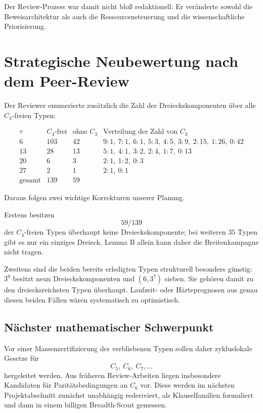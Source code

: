 \documentclass[11pt,a4paper]{article}
\begin{document}
Der Review-Prozess war damit nicht bloß redaktionell: Er veränderte sowohl die Beweisarchitektur als auch die Ressourcensteuerung und die wissenschaftliche Priorisierung.

\section{Strategische Neubewertung nach dem Peer-Review}

Der Reviewer enumerierte zusätzlich die Zahl der Dreieckskomponenten über alle $C_4$-freien Typen:

\[
\begin{array}{c|r|r|l}
\tau & C_4\text{-frei} & \text{ohne }C_3 & \text{Verteilung der Zahl von }C_3\\
\hline
6 & 103 & 42 & 9{:}1,\ 7{:}1,\ 6{:}1,\ 5{:}3,\ 4{:}5,\ 3{:}9,\ 2{:}15,\ 1{:}26,\ 0{:}42\\
13& 28  & 13 & 5{:}1,\ 4{:}1,\ 3{:}2,\ 2{:}4,\ 1{:}7,\ 0{:}13\\
20& 6   & 3  & 2{:}1,\ 1{:}2,\ 0{:}3\\
27& 2   & 1  & 2{:}1,\ 0{:}1\\
\hline
\text{gesamt}&139&59&
\end{array}
\]

Daraus folgen zwei wichtige Korrekturen unserer Planung.

Erstens besitzen
\[
\boxed{59/139}
\]
der $C_4$-freien Typen überhaupt keine Dreieckskomponente; bei weiteren $35$ Typen gibt es nur ein einziges Dreieck. Lemma B allein kann daher die Breitenkampagne nicht tragen.

Zweitens sind die beiden bereits erledigten Typen strukturell besonders günstig: $3^9$ besitzt neun Dreieckskomponenten und $(6,3^7)$ sieben. Sie gehören damit zu den dreiecksreichsten Typen überhaupt. Laufzeit- oder Härteprognosen aus genau diesen beiden Fällen wären systematisch zu optimistisch.

\subsection{Nächster mathematischer Schwerpunkt}

Vor einer Massenzertifizierung der verbliebenen Typen sollen daher zykluslokale Gesetze für
\[
C_5,\ C_6,\ C_7,\ldots
\]
hergeleitet werden. Aus früheren Review-Arbeiten liegen insbesondere Kandidaten für Paritätsbedingungen an $C_6$ vor. Diese werden im nächsten Projektabschnitt zunächst unabhängig rederiviert, als Klauselfamilien formuliert und dann in einem billigen Breadth-Scout gemessen.
\end{document}
